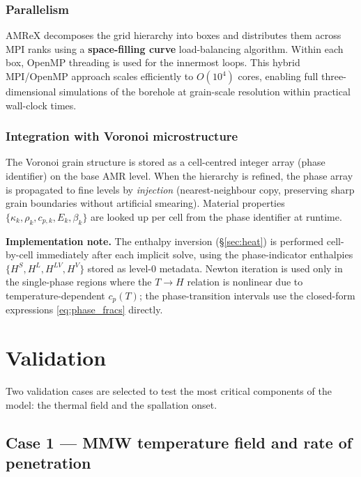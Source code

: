 \documentclass[12pt, a4paper]{article}
\begin{document}
\subsubsection{Parallelism}

AMReX decomposes the grid hierarchy into boxes and distributes them
across MPI ranks using a \textbf{space-filling curve} load-balancing
algorithm.  Within each box, OpenMP threading is used for the innermost
loops.  This hybrid MPI/OpenMP approach scales efficiently to $O(10^4)$
cores, enabling full three-dimensional simulations of the borehole at
grain-scale resolution within practical wall-clock times.

\subsubsection{Integration with Voronoi microstructure}

The Voronoi grain structure is stored as a cell-centred integer array
(phase identifier) on the base AMR level.  When the hierarchy is
refined, the phase array is propagated to fine levels by
\emph{injection} (nearest-neighbour copy, preserving sharp grain
boundaries without artificial smearing).  Material properties
$\{\kappa_k, \rho_k, c_{p,k}, E_k, \beta_k\}$ are looked up per cell
from the phase identifier at runtime.

\begin{notebox}
\textbf{Implementation note.}  The enthalpy inversion
(\S\ref{sec:heat}) is performed cell-by-cell immediately after each
implicit solve, using the phase-indicator enthalpies
$\{H^S, H^L, H^{LV}, H^V\}$ stored as level-0 metadata.  Newton
iteration is used only in the single-phase regions where the
$T \to H$ relation is nonlinear due to temperature-dependent $c_p(T)$;
the phase-transition intervals use the closed-form expressions
\cref{eq:phase_fracs} directly.
\end{notebox}

\section{Validation}
\label{sec:validation}

Two validation cases are selected to test the most critical components of the
model: the thermal field and the spallation onset.

\subsection{Case 1 — MMW temperature field and rate of penetration
            \textnormal{\citep{zhang2023thermal}}}
\label{sec:val_zhang}
\end{document}
